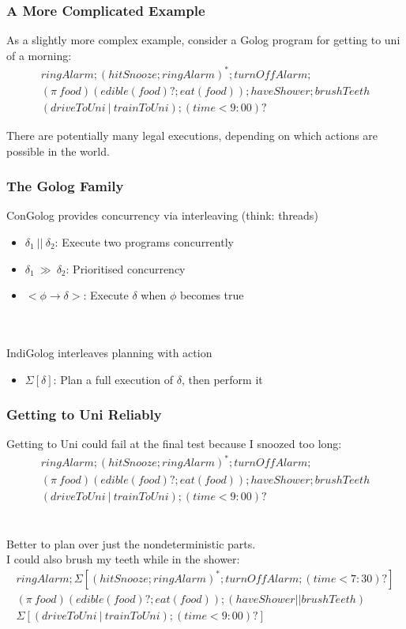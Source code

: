 \documentclass{beamer}
\begin{document}
\begin{frame}
\frametitle{A More Complicated Example}
As a slightly more complex example, consider a Golog program for
getting to uni of a morning:\[
\begin{array}{c}
ringAlarm;(hitSnooze; ringAlarm)^*;turnOffAlarm;\\
(\pi\ food)(edible(food)?;eat(food)); haveShower; brushTeeth\\
(driveToUni\ |\ trainToUni); (time<9:00)?
\end{array}\]

There are potentially many legal executions, depending on which actions
are possible in the world.
\end{frame}

\begin{frame}
\frametitle{The Golog Family}
ConGolog provides concurrency via interleaving (think: threads)
\begin{itemize}
  \item $\delta_1\ ||\ \delta_2$: Execute two programs concurrently
  \item $\delta_1\ \gg\ \delta_2$: Prioritised concurrency
  \item $<\phi \rightarrow \delta>$: Execute $\delta$ when $\phi$ becomes true
\end{itemize}
\ \\
\ \\
\pause
IndiGolog interleaves planning with action
\begin{itemize}
  \item $\Sigma[\delta]$: Plan a full execution of $\delta$, then perform it
\end{itemize}

\end{frame}

\begin{frame}
\frametitle{Getting to Uni Reliably}
Getting to Uni could fail at the final test because I snoozed too long:\[
\begin{array}{c}
ringAlarm;(hitSnooze; ringAlarm)^*;turnOffAlarm;\\
(\pi\ food)(edible(food)?;eat(food)); haveShower; brushTeeth\\
(driveToUni\ |\ trainToUni); (time<9:00)?
\end{array}\]\\
\ \\
\pause
Better to plan over just the nondeterministic parts.\\
I could also brush my teeth while in the shower:
\[
\begin{array}{c}
ringAlarm;\Sigma[(hitSnooze; ringAlarm)^*;turnOffAlarm;(time<7:30)?]\\
(\pi\ food)(edible(food)?;eat(food)); (haveShower || brushTeeth)\\
\Sigma[(driveToUni\ |\ trainToUni); (time<9:00)?]
\end{array}\]\\
\end{frame}
\end{document}
